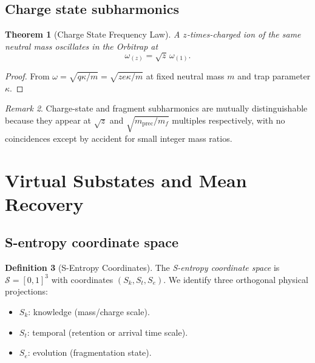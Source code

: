 \documentclass[twocolumn,10pt,a4paper]{article}
\theoremstyle{thmstyle}
\newtheorem{theorem}{Theorem}[section]
\theoremstyle{definition}
\newtheorem{definition}[theorem]{Definition}
\theoremstyle{remark}
\newtheorem{remark}[theorem]{Remark}
\newcommand{\Sspace}{\mathcal{S}}
\begin{document}
\subsection{Charge state subharmonics}

\begin{theorem}[Charge State Frequency Law]
\label{thm:zfreq}
A $z$-times-charged ion of the same neutral mass oscillates in the
Orbitrap at
\begin{equation}
\omega_{(z)}=\sqrt{z}\,\omega_{(1)}.
\label{eq:zfreq}
\end{equation}
\end{theorem}

\begin{proof}
From $\omega=\sqrt{q\kappa/m}=\sqrt{ze\kappa/m}$ at fixed neutral
mass $m$ and trap parameter $\kappa$.
\end{proof}

\begin{remark}
Charge-state and fragment subharmonics are mutually distinguishable
because they appear at $\sqrt{z}$ and $\sqrt{m_{\mathrm{prec}}/m_{f}}$
multiples respectively, with no coincidences except by accident for
small integer mass ratios.
\end{remark}

\section{Virtual Substates and Mean Recovery}
\label{sec:virtual}

\subsection{S-entropy coordinate space}

\begin{definition}[S-Entropy Coordinates]
\label{def:Sspace}
The \emph{S-entropy coordinate space} is
$\Sspace=[0,1]^{3}$ with coordinates $(S_{k},S_{t},S_{e})$. We
identify three orthogonal physical projections:
\begin{itemize}[nosep,leftmargin=*]
\item $S_{k}$: knowledge (mass/charge scale).
\item $S_{t}$: temporal (retention or arrival time scale).
\item $S_{e}$: evolution (fragmentation state).
\end{itemize}
\end{definition}
\end{document}
